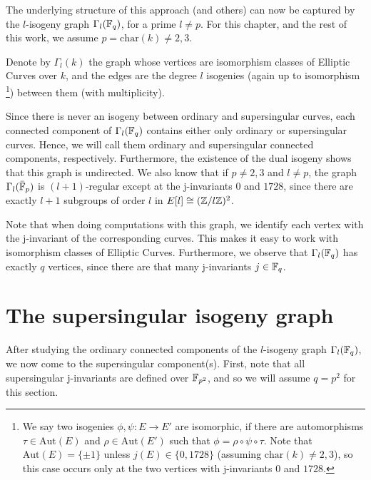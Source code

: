 The underlying structure of this approach (and others) can now be captured by the $l$-isogeny graph $\Gamma_l(\mathbb{F}_q)$, for a prime $l \neq p$.
For this chapter, and the rest of this work, we assume $p = \mathrm{char}(k) \neq 2, 3$.
\begin{definition}
    Denote by $\Gamma_l(k)$ the graph whose vertices are isomorphism classes of Elliptic Curves over $k$, and the edges are the degree $l$ isogenies (again up to isomorphism
    \footnote{We say two isogenies $\phi, \psi: E \to E'$ are isomorphic, if there are automorphisms $\tau \in \mathrm{Aut}(E)$ and $\rho \in \mathrm{Aut}(E')$ such that $\phi = \rho \circ \psi \circ \tau$.
    Note that $\mathrm{Aut}(E) = \{ \pm 1 \}$ unless $j(E) \in \{ 0, 1728 \}$ (assuming $\mathrm{char}(k) \neq 2, 3$), so this case occurs only at the two vertices with j-invariants $0$ and $1728$.}) 
    between them (with multiplicity).
\end{definition}
Since there is never an isogeny between ordinary and supersingular curves, each connected component of $\Gamma_l(\mathbb{F}_q)$ contains either only ordinary or supersingular curves.
Hence, we will call them ordinary and supersingular connected components, respectively.
Furthermore, the existence of the dual isogeny shows that this graph is undirected.
We also know that if $p \neq 2, 3$ and $l \neq p$, the graph $\Gamma_l(\bar{\mathbb{F}}_p)$ is $(l + 1)$-regular except at the j-invariants $0$ and $1728$, since there are exactly $l + 1$ subgroups of order $l$ in $E[l] \cong (\mathbb{Z}/l\mathbb{Z})^2$.

Note that when doing computations with this graph, we identify each vertex with the j-invariant of the corresponding curves.
This makes it easy to work with isomorphism classes of Elliptic Curves.
Furthermore, we observe that $\Gamma_l(\mathbb{F}_q)$ has exactly $q$ vertices, since there are that many j-invariants $j \in \mathbb{F}_q$.



\section{The supersingular isogeny graph}
\label{sec:supersingular_isogeny_graph}
After studying the ordinary connected components of the $l$-isogeny graph $\Gamma_l(\mathbb{F}_q)$, we now come to the supersingular component(s).
First, note that all supersingular j-invariants are defined over $\mathbb{F}_{p^2}$, and so we will assume $q = p^2$ for this section.

